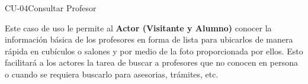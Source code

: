 \begin{UseCase}{CU-04}{Consultar Profesor}
    {
	Este caso de uso le permite al \textbf{Actor (Visitante y Alumno)} conocer la información básica de los profesores en forma de lista para ubicarlos de manera rápida en cubículos o salones y por medio de la foto proporcionada por ellos. Esto facilitará a los actores la tarea de buscar a profesores que no conocen en persona o cuando se requiera buscarlo para asesorias, trámites, etc.
	
    }


%			


\end{UseCase}
